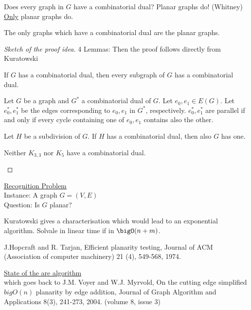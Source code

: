 \documentclass[aagt.tex]{subfiles}
\begin{document}
Does every graph in $G$ have a combinatorial dual?
Planar graphs do! (Whitney) \underline{Only} planar graphs do.

\begin{theorem}[Whitney]
  The only graphs which have a combinatorial dual are the planar graphs.
\end{theorem}

\begin{proof}[Sketch of the proof idea]
  4 Lemmas: Then the proof follows directly from Kuratowski
  \begin{lemma}\label{th_4_16_l_1}
    If $G$ has a combinatorial dual, then every subgraph of $G$ has a combinatorial dual.
  \end{lemma}
  \begin{lemma}\label{th_4_16_l_2}
    Let $G$ be a graph and $G^\ast$ a combinatorial dual of $G$. Let $e_0,e_1 \in E(G)$.
    Let $e_0^\ast,e_1^\ast$ be the edges corresponding to $e_0,e_1$ in $G^\ast$, respectively.
    $e_0^\ast,e_1^\ast$ are parallel if and only if every cycle containing one of $e_0,e_1$ contains also the other.
  \end{lemma}
  \begin{lemma}\label{th_4_16_l_3}
    Let $H$ be a subdivision of $G$. If $H$ has a combinatorial dual, then also $G$ has one.
  \end{lemma}
  \begin{lemma}\label{th_4_16_l_4}
    Neither $K_{3,3}$ nor $K_5$ have a combinatorial dual.
  \end{lemma}
\end{proof}


\underline{Recognition Problem}\\
Instance: A graph $G=(V,E)$\\
Question: Is $G$ planar?

Kuratowski gives a characterisation which would lead to an exponential algorithm.
Solvale in linear time if in $\bigO(n+m)$.

J.Hopcraft and R. Tarjan, Efficient planarity testing, Journal of ACM (Association of computer machinery) 21 (4), 549-568, 1974.

\underline{State of the are algorithm}\\
which goes back to J.M. Voyer and W.J. Myrvold, On the cutting edge simplified $bigO(n)$ planarity by edge addition,
Journal of Graph Algorithm and Applications 8(3), 241-273, 2004. (volume 8, issue 3)
\end{document}
